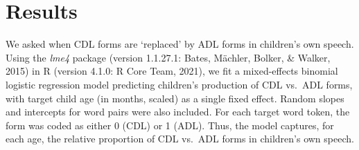 \documentclass[10pt, letterpaper]{article}
\begin{document}
\begin{table}[!h]

\caption{\label{tab:tab:tab1}CHILDES frequency for 15 CDL/ADL word pairs. Child-produced counts include tokens produced only by the target child.}
\centering
{}
\end{table}

\hypertarget{results}{%
\section{Results}\label{results}}

We asked when CDL forms are `replaced' by ADL forms in children's own
speech. Using the \emph{lme4} package (version 1.1.27.1: Bates, Mächler,
Bolker, \& Walker, 2015) in R (version 4.1.0: R Core Team, 2021), we fit
a mixed-effects binomial logistic regression model predicting children's
production of CDL vs.~ADL forms, with target child age (in months,
scaled) as a single fixed effect. Random slopes and intercepts for word
pairs were also included. For each target word token, the form was coded
as either 0 (CDL) or 1 (ADL). Thus, the model captures, for each age,
the relative proportion of CDL vs.~ADL forms in children's own speech.
\end{document}
